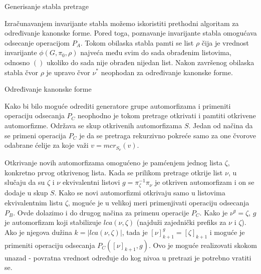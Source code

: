 \documentclass[12pt,oneside]{memoir}
\theoremstyle{definition}
\begin{document}
  \begin{algorithm}[H]
	  \caption{Generisanje stabla pretrage}
	  \begin{algorithmic}[1]
		  \EndFor
		  \EndProcedure
	  \end{algorithmic}
  \end{algorithm}

  Izračunavanjem invarijante stabla možemo iskoristiti prethodni algoritam za
  određivanje kanonske forme. Pored toga, poznavanje invarijante stabla
  omogućava odsecanje operacijom $P_A$. Tokom obilaska stabla pamti se list
  $\rho$ čija je vrednost invarijante $\phi(G, \pi_0, \rho)$ najveća među svim
  do sada obrađenim listovima, odnosno $()$ ukoliko do sada nije obrađen
  nijedan list. Nakon završenog obilaska stabla čvor $\rho$ je upravo čvor
  $\nu^*$ neophodan za određivanje kanonske forme.

  \begin{algorithm}[H]
	  \caption{Određivanje kanonske forme}
	  \begin{algorithmic}[1]
		  	\State \Return
		  \EndIf
		  \EndFor
				\State {$\rho \gets \nu$}
			\EndIf
		  \EndIf
		  \EndProcedure
	  \end{algorithmic}
  \end{algorithm}

  Kako bi bilo moguće odrediti generatore grupe automorfizama i primeniti
  operaciju odsecanja $P_C$ neophodno je tokom pretrage otkrivati i pamtiti
  otkrivene automorfizme. Održava se skup otkrivenih automorfizama $S$. Jedan
  od načina da se primeni operacija $P_C$ je da se pretraga rekurzivno pokreće
  samo za one čvorove odabrane ćelije za koje važi $v = mcr_{S_\nu}(v)$.

  Otkrivanje novih automorfizama omogućeno je pamćenjem jednog lista $\zeta$,
  konkretno prvog otkrivenog lista. Kada se prilikom pretrage otkrije list
  $\nu$, u slučaju da su $\zeta$ i $\nu$ ekvivalentni listovi $g =
  \pi_\zeta^{-1} \pi_\nu$ je otkriven automorfizam i on se dodaje u skup $S$.
  Kako se novi automorfizmi otkrivaju samo u listovima ekvivalentnim listu
  $\zeta$, moguće je u velikoj meri primenjivati operaciju odsecanja $P_B$.
  Ovde dolazimo i do drugog načina za primenu operacije $P_C$. Kako je $\nu^g =
  \zeta$, $g$ je automorfizam koji stabilizuje $lca(\nu, \zeta)$ (najduži
  zajednički prefiks za $\nu$ i $\zeta$). Ako je njegova dužina $k = |lca(\nu,
  \zeta)|$, tada je $[\nu]_{k+1}^g = [\zeta]_{k+1}$ i moguće je primeniti
  operaciju odsecanja $P_C([\nu]_{k+1}, g)$. Ovo je moguće realizovati skokom
  unazad - povratna vrednost određuje do kog nivoa u pretrazi je potrebno
  vratiti se.
\end{document}

